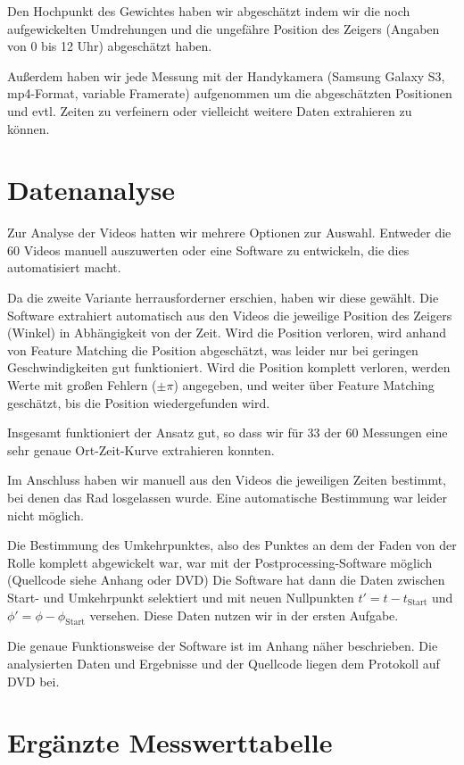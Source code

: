 \documentclass[a4paper,german,12pt,smallheadings]{scrartcl}
\begin{document}
Den Hochpunkt des Gewichtes haben wir abgeschätzt indem wir die noch
aufgewickelten Umdrehungen und die ungefähre Position des Zeigers (Angaben von
0 bis 12 Uhr) abgeschätzt haben.

Außerdem haben wir jede Messung mit der Handykamera (Samsung Galaxy S3,
mp4-Format, variable Framerate) aufgenommen um die abgeschätzten Positionen und
evtl. Zeiten zu verfeinern oder vielleicht weitere Daten extrahieren zu können.

\section*{Datenanalyse}
Zur Analyse der Videos hatten wir mehrere Optionen zur Auswahl. Entweder die 60
Videos manuell auszuwerten oder eine Software zu entwickeln, die dies
automatisiert macht.

Da die zweite Variante herrausforderner erschien, haben wir diese gewählt. Die
Software extrahiert automatisch aus den Videos die jeweilige Position des
Zeigers (Winkel) in Abhängigkeit von der Zeit. Wird die Position verloren, wird
anhand von Feature Matching die Position abgeschätzt, was leider nur bei
geringen Geschwindigkeiten gut funktioniert. Wird die Position komplett
verloren, werden Werte mit großen Fehlern ($\pm \pi$) angegeben, und weiter
über Feature Matching geschätzt, bis die Position wiedergefunden wird.

Insgesamt funktioniert der Ansatz gut, so dass wir für 33 der 60 Messungen eine
sehr genaue Ort-Zeit-Kurve extrahieren konnten.

Im Anschluss haben wir manuell aus den Videos die jeweiligen Zeiten bestimmt,
bei denen das Rad losgelassen wurde. Eine automatische Bestimmung war leider
nicht möglich.

Die Bestimmung des Umkehrpunktes, also des Punktes an dem der Faden von der
Rolle komplett abgewickelt war, war mit der Postprocessing-Software möglich
(Quellcode siehe Anhang oder DVD) %
Die Software hat dann die Daten zwischen Start- und Umkehrpunkt selektiert und
mit neuen Nullpunkten $t' = t - t_\text{Start}$ und $\phi' = \phi -
\phi_\text{Start}$ versehen. Diese Daten nutzen wir in der ersten Aufgabe.

Die genaue Funktionsweise der Software ist im Anhang näher beschrieben. Die
analysierten Daten und Ergebnisse und der Quellcode liegen dem Protokoll auf
DVD bei.

\section*{Ergänzte Messwerttabelle}
\end{document}
